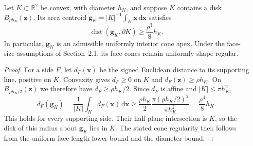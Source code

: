 \documentclass[review,hidelinks,onefignum,onetabnum]{siamart251216}
\begin{document}
\begin{lemma}\label{lem:centroid-interior}
Let $K\subset\mathbb R^2$ be convex, with diameter $h_K$, and suppose
$K$ contains a disk $B_{\rho h_K}(\boldsymbol z)$.
Its area centroid
$\boldsymbol g_K=|K|^{-1}\int_K\boldsymbol x\,\mathrm d\boldsymbol x$
satisfies
\[
 \operatorname{dist}(\boldsymbol g_K,\partial K)
 \ge \frac{\rho^3}{8}h_K.
\]
In particular, $\boldsymbol g_K$ is an admissible uniformly interior
cone apex. Under the face-size assumptions of Section~2.1, its face
cones remain uniformly shape regular.
\end{lemma}
\begin{proof}
For a side $F$, let $d_F(\boldsymbol x)$ be the signed Euclidean
distance to its supporting line, positive on $K$. Convexity gives
$d_F\ge0$ on $K$ and $d_F(\boldsymbol z)\ge\rho h_K$.
On $B_{\rho h_K/2}(\boldsymbol z)$ we therefore have
$d_F\ge\rho h_K/2$. Since $d_F$ is affine and
$|K|\le\pi h_K^2$,
\[
 d_F(\boldsymbol g_K)
 =\frac1{|K|}\int_K d_F(\boldsymbol x)\,\mathrm d\boldsymbol x
 \ge\frac{\rho h_K}{2}
 \frac{\pi(\rho h_K/2)^2}{\pi h_K^2}
 =\frac{\rho^3}{8}h_K.
\]
This holds for every supporting side. Their half-plane intersection
is $K$, so the disk of this radius about $\boldsymbol g_K$ lies in $K$.
The stated cone regularity then follows from the uniform face-length
lower bound and the diameter bound.
\end{proof}
\end{document}

